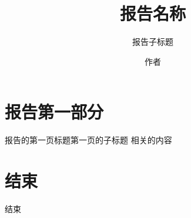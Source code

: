 \documentclass[t]{beamer}
\title{报告名称}
\subtitle{报告子标题}
\institute{西安交通大学\ 软件学院 }
\author{作者}
\begin{document}
	\frame{\titlepage}
	\section[主要内容]{}
	\frame{\tableofcontents}
	
	\section{报告第一部分}
	\begin{frame}{报告的第一页标题}{第一页的子标题}
				 \vspace{-20pt}%
		相关的内容
	\end{frame}
\section{结束}
\begin{frame}[c]{结束}
			 \vspace{-20pt}%
\end{frame}
\end{document}
